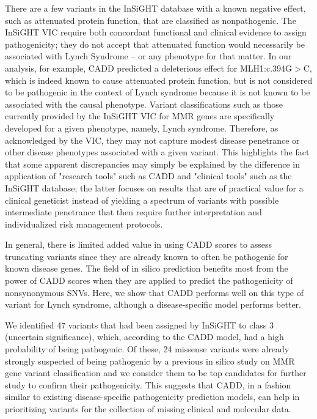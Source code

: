 There are a few variants in the InSiGHT database with a known negative effect, such as attenuated protein function, that are classified as nonpathogenic.
The InSiGHT VIC require both concordant functional and clinical evidence to assign pathogenicity; they do not accept that attenuated function would necessarily be associated with Lynch Syndrome – or any phenotype for that matter.
In our analysis, for example, CADD predicted a deleterious effect for MLH1:c.394G$>$C, which is indeed known to cause attenuated protein function\cite{Lipkin_2004}, but is not considered to be pathogenic in the context of Lynch syndrome because it is not known to be associated with the causal phenotype.
Variant classifications such as those currently provided by the InSiGHT VIC for MMR genes are specifically developed for a given phenotype, namely, Lynch syndrome.
Therefore, as acknowledged by the VIC\cite{Thompson_2013a}, they may not capture modest disease penetrance or other disease phenotypes associated with a given variant.
This highlights the fact that some apparent discrepancies may simply be explained by the difference in application of "research tools" such as CADD and "clinical tools" such as the InSiGHT database;
the latter focuses on results that are of practical value for a clinical geneticist instead of yielding a spectrum of variants with possible intermediate penetrance that then require further interpretation and individualized risk management protocols.

In general, there is limited added value in using CADD scores to assess truncating variants since they are already known to often be pathogenic for known disease genes.
The field of in silico prediction benefits most from the power of CADD scores when they are applied to predict the pathogenicity of nonsynonymous SNVs.
Here, we show that CADD performs well on this type of variant for Lynch syndrome, although a disease-specific model performs better.

We identified 47 variants that had been assigned by InSiGHT to class 3 (uncertain significance), which, according to the CADD model, had a high probability of being pathogenic.
Of these, 24 missense variants were already strongly suspected of being pathogenic by a previous in silico study on MMR gene variant classification\cite{Thompson_2013b} and we consider them to be top candidates for further study to confirm their pathogenicity.
This suggests that CADD, in a fashion similar to existing disease-specific pathogenicity prediction models, can help in prioritizing variants for the collection of missing clinical and molecular data.

